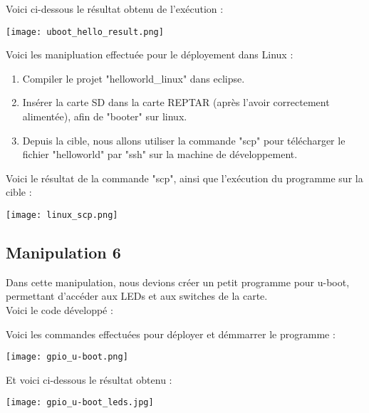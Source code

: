 Voici ci-dessous le résultat obtenu de l'exécution : 

\begin{center} 
\hspace{12.45cm}
\texttt{[image: uboot\_hello\_result.png]}
\end{center}
\vspace{1cm} 

\pagebreak

Voici les manipluation effectuée pour le déployement dans Linux :
\begin{enumerate}
\item Compiler le projet "helloworld\_linux" dans eclipse.
\item Insérer la carte SD dans la carte REPTAR (après l'avoir correctement alimentée), afin de "booter" sur linux.
\item Depuis la cible, nous allons utiliser la commande "scp" pour télécharger le fichier "helloworld" par "ssh" sur la machine de développement.
\end{enumerate}

Voici le résultat de la commande "scp", ainsi que l'exécution du programme sur la cible : 

\begin{center} 
\hspace{12.45cm}
\texttt{[image: linux\_scp.png]}
\end{center}
\vspace{1cm} 

\pagebreak
\subsection{Manipulation 6}

Dans cette manipulation, nous devions créer un petit programme pour u-boot, permettant d'accéder aux LEDs et aux switches de la carte.\\

Voici le code développé : 


\vspace{1cm} 


Voici les commandes effectuées pour déployer et démmarrer le programme :
\begin{center} 
\hspace{12.45cm}
\texttt{[image: gpio\_u-boot.png]}
\end{center}
\vspace{1cm} 
\pagebreak

Et voici ci-dessous le résultat obtenu :
\begin{center} 
\hspace{12.45cm}
\texttt{[image: gpio\_u-boot\_leds.jpg]}
\end{center}
\vspace{1cm} 
